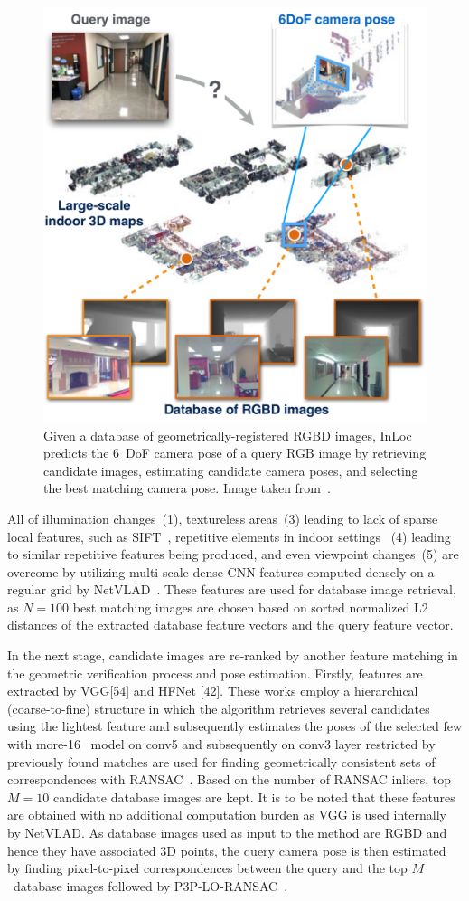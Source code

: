 \begin{figure}
    \centering
    \includegraphics[width=.5\linewidth]{../graphics/inloc.png}
    \caption{Given a database of geometrically-registered RGBD images, InLoc predicts
    the 6~DoF camera pose of a query RGB image by retrieving candidate images, estimating candidate camera poses, and selecting
    the best matching camera pose. Image taken from~\citet{InLoc}.}\label{fig:inloc_intro}
\end{figure}

All of illumination changes~(1), textureless areas~(3) leading to lack of sparse local features, such as SIFT~\citep{SIFT},
repetitive elements in indoor settings ~(4) leading to similar repetitive features being produced, and even viewpoint changes~(5)
are overcome by utilizing multi-scale dense CNN features computed densely on a regular grid by NetVLAD~\citep{NetVLAD}.
These features are used for database image retrieval, as $N=100$ best matching images are chosen based on sorted
normalized L2 distances of the extracted database feature vectors and the query feature vector.

In the next stage, candidate images are re-ranked by another feature matching in the geometric verification process and
pose estimation. Firstly, features are extracted by VGG[54] and HFNet [42]. These works employ a hierarchical (coarse-to-fine)
structure in which the algorithm retrieves several candidates using the lightest feature and subsequently estimates
the poses of the selected few with more-16~\citep{VGG16} model on conv5 and subsequently on conv3 layer
restricted by previously found matches are used for finding geometrically consistent sets of correspondences with
RANSAC~\citep{RANSAC}. Based on the number of RANSAC inliers, top $M = 10$ candidate database images are kept.
It is to be noted that these features are obtained with no additional computation burden as VGG is used internally
by NetVLAD. As database images used as input to the method are RGBD and hence they have associated 3D points, the
query camera pose is then estimated by finding pixel-to-pixel correspondences between the query and the top
$M$~database images followed by P3P-LO-RANSAC~\citep{P3PLORANSAC}.

